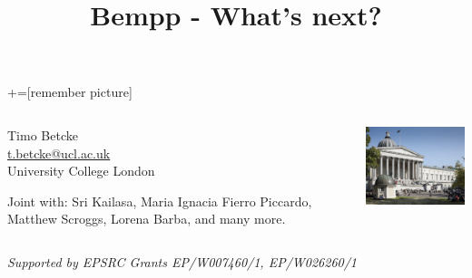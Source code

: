\documentclass[dvipsnames,10pt]{beamer}
\title{Bempp - What's next?}
\date{}
\begin{document}
\lstset{language=Python}
+=[remember picture]
\begin{frame}

\vspace{1cm}

\titlepage
\vspace{-2cm}
\begin{columns}[T]
\begin{column}{.48\textwidth}
\begin{center}
    Timo Betcke \\
    \url{t.betcke@ucl.ac.uk}\\
    University College London
\end{center}
\begin{tcolorbox}
Joint with: Sri Kailasa, Maria Ignacia Fierro Piccardo, Matthew Scroggs, Lorena Barba, and many more.
\end{tcolorbox}
\end{column}%
\hfill%
\begin{column}{.48\textwidth}
\includegraphics[width=5cm]{../figs/ucl_campus}

\end{column}%
\end{columns}
\textit{Supported by EPSRC Grants EP/W007460/1, EP/W026260/1}

\end{frame}
\end{document}
